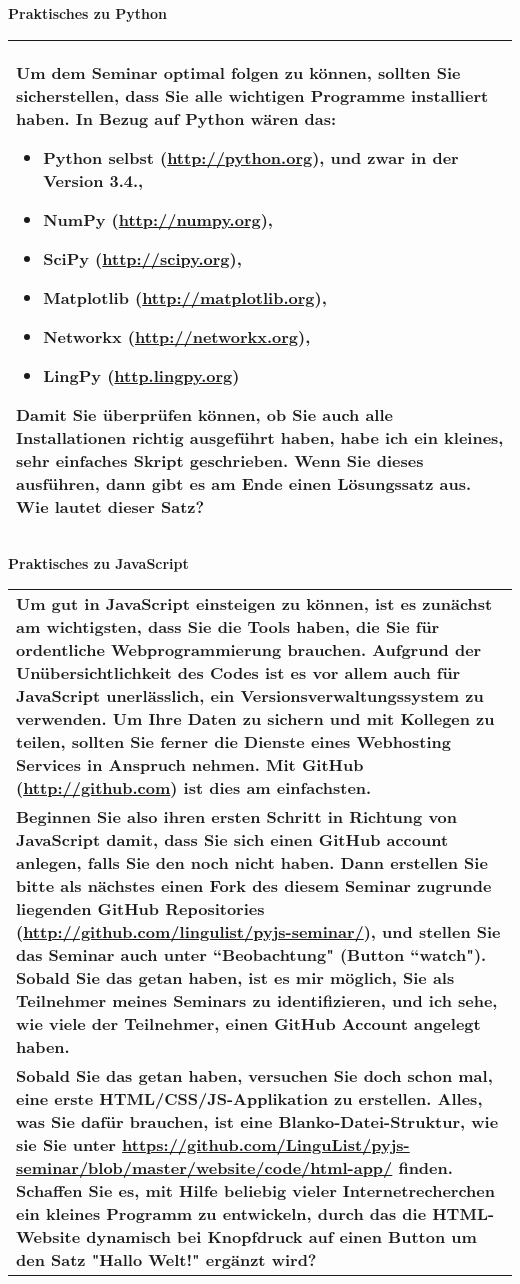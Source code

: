 \documentclass[xetex,svgnames]{scrartcl}
\newcommand{\Table}[1]{%
    \begin{flushleft}
        \begin{tabular}{|p{16.5cm}|}
            \hline \cellcolor{lightgray} \bf \pur #1
            \\\hline
        \end{tabular}
    \end{flushleft}
}
\begin{document}

\begin{center}
  \bf \huge Praktisches zu Python
\end{center}

\Table{Um dem Seminar optimal folgen zu können, sollten Sie sicherstellen, dass Sie alle wichtigen
Programme installiert haben. In Bezug auf Python wären das:
\begin{itemize}
  \item Python selbst (\url{http://python.org}), und zwar in der Version 3.4.,
  \item NumPy (\url{http://numpy.org}),
  \item SciPy (\url{http://scipy.org}),
  \item Matplotlib (\url{http://matplotlib.org}),
  \item Networkx (\url{http://networkx.org}),
  \item LingPy (\url{http.lingpy.org})
\end{itemize}

Damit Sie überprüfen können, ob Sie auch alle Installationen richtig ausgeführt haben, habe ich ein kleines,
sehr einfaches Skript geschrieben. Wenn Sie dieses ausführen, dann gibt es am Ende einen Lösungssatz
aus. Wie lautet dieser Satz?}
\begin{center}
  \bf \huge Praktisches zu JavaScript
\end{center}
\Table{Um gut in JavaScript einsteigen zu können, ist es zunächst am wichtigsten, dass Sie die Tools haben,
die Sie für ordentliche Webprogrammierung brauchen. Aufgrund der Unübersichtlichkeit des Codes ist
es vor allem auch für JavaScript unerlässlich, ein Versionsverwaltungssystem zu verwenden. Um Ihre
Daten zu sichern und mit Kollegen zu teilen, sollten Sie ferner die Dienste eines Webhosting
Services in Anspruch nehmen. Mit GitHub (\url{http://github.com}) ist dies am einfachsten. 
\\
\bf\pur\cellcolor{lightgray}
Beginnen Sie also ihren ersten Schritt in Richtung von JavaScript damit, dass Sie sich einen GitHub
account anlegen, falls Sie den noch nicht haben. 
Dann erstellen Sie bitte als nächstes einen Fork des diesem Seminar zugrunde liegenden GitHub
Repositories (\url{http://github.com/lingulist/pyjs-seminar/}), und stellen Sie das Seminar auch
unter ``Beobachtung" (Button ``watch"). Sobald Sie das getan haben, ist es mir möglich, Sie als
Teilnehmer meines Seminars zu identifizieren, und ich sehe, wie viele der Teilnehmer, einen GitHub
Account angelegt haben.
\\
\bf\pur\cellcolor{lightgray}Sobald Sie das getan haben, versuchen Sie doch schon mal, eine erste
HTML/CSS/JS-Applikation zu erstellen. Alles, was Sie dafür brauchen, ist eine Blanko-Datei-Struktur,
wie sie Sie unter \url{https://github.com/LinguList/pyjs-seminar/blob/master/website/code/html-app/}
finden. Schaffen Sie es, mit Hilfe beliebig vieler Internetrecherchen ein kleines Programm zu
entwickeln, durch das die HTML-Website dynamisch bei Knopfdruck auf einen Button um den Satz "Hallo Welt!" ergänzt
wird?
}
\pagebreak
\end{document}
